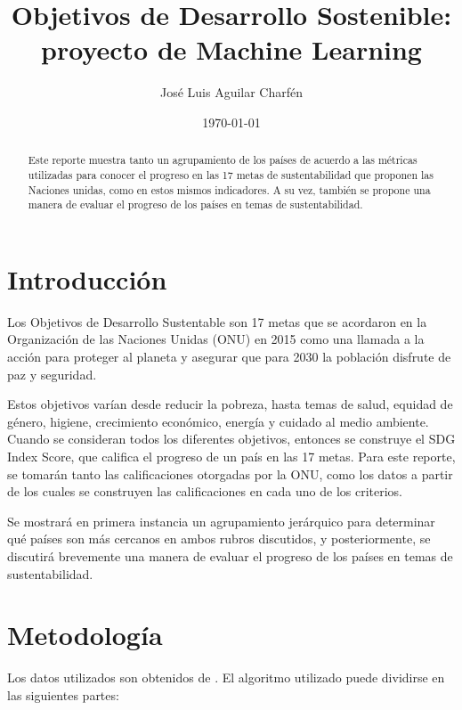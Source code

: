 \documentclass[a4paper,12pt]{amsart}
\author{José Luis Aguilar Charfén}
\date{\today}
\title{Objetivos de Desarrollo Sostenible: proyecto de Machine Learning}
\begin{document}
    \begin{abstract} %
        Este reporte muestra tanto un agrupamiento de los países de acuerdo a 
        las métricas utilizadas para conocer el progreso en las 17 metas de 
        sustentabilidad que proponen las Naciones unidas, como en estos mismos 
        indicadores. A su vez, también se propone una manera de evaluar el progreso 
        de los países en temas de sustentabilidad. 
    \end{abstract}
    \maketitle

    \section{Introducción}

    Los Objetivos de Desarrollo Sustentable son 17 metas que se acordaron en la 
    Organización de las Naciones Unidas (ONU) en 2015 \cite{united_nations_development_programme_sustainable_nodate-1}
    como una llamada a la acción para proteger al planeta y asegurar que para
    2030 la población disfrute de paz y seguridad. 

    Estos objetivos varían desde reducir la pobreza, hasta temas de salud, 
    equidad de género, higiene, crecimiento económico, energía y cuidado al medio ambiente. 
    Cuando se consideran todos los diferentes objetivos, entonces se construye el 
    SDG Index Score, que califica el progreso de un país en las 17 metas. Para 
    este reporte, se tomarán tanto las calificaciones otorgadas por la ONU, como
    los datos a partir de los cuales se construyen las calificaciones en cada 
    uno de los criterios.

    Se mostrará en primera instancia un agrupamiento jerárquico para determinar 
    qué países son más cercanos en ambos rubros discutidos, y posteriormente, se 
    discutirá brevemente una manera de evaluar el progreso de los países en temas 
    de sustentabilidad. 
    		
    \section{Metodología}

    Los datos utilizados son obtenidos de \cite{united_nations_development_programme_sustainable_nodate}. 
    El algoritmo utilizado puede dividirse en las siguientes partes: 
\end{document}
